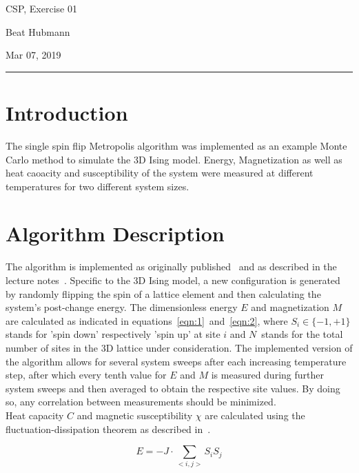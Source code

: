 \documentclass[11pt,a4paper]{article}
\begin{document}
\noindent\parbox{\linewidth}{
 \parbox{.25\linewidth}{ \large CSP, Exercise 01 }\hfill
 \parbox{.5\linewidth}{\begin{center} \large Beat Hubmann \end{center}}\hfill
 \parbox{.2\linewidth}{\begin{flushright} \large Mar 07, 2019 \end{flushright}}
}
\noindent\rule{\linewidth}{2pt}


\section{Introduction}

The single spin flip Metropolis algorithm was implemented as an example Monte Carlo method to simulate
the 3D Ising model. Energy, Magnetization as well as heat caoacity and susceptibility of the system were measured at different temperatures for two different
system sizes.

\section{Algorithm Description}
The algorithm is implemented as originally published~\cite{metropolis} and as described in the lecture notes~\cite{herrmann}.
Specific to the 3D Ising model, a new configuration is generated by randomly flipping the spin of a lattice element
and then calculating the system's post-change energy.
The dimensionless energy $E$ and magnetization $M$ are calculated as indicated in equations~\ref{eqn:1}~and~\ref{eqn:2}, where
$S_i \in \{-1, +1\}$ stands for 'spin down' respectively 'spin up' at site $i$ and $N$~stands for the total number of sites in
the 3D lattice under consideration.
The implemented version of the algorithm allows for several system sweeps after each increasing temperature step,
after which every tenth value for $E$ and $M$ is measured during further system sweeps and then averaged to obtain
the respective site values. By doing so, any correlation between measurements should be minimized.\\
Heat capacity $C$ and magnetic susceptibility $\chi$ are calculated using the fluctuation-dissipation theorem as described in~\cite{boettcher}.

\begin{equation}
	E = -J \cdot \sum_{<i, j>}S_i S_j
\label{eqn:1}
\end{equation}
\end{document}

